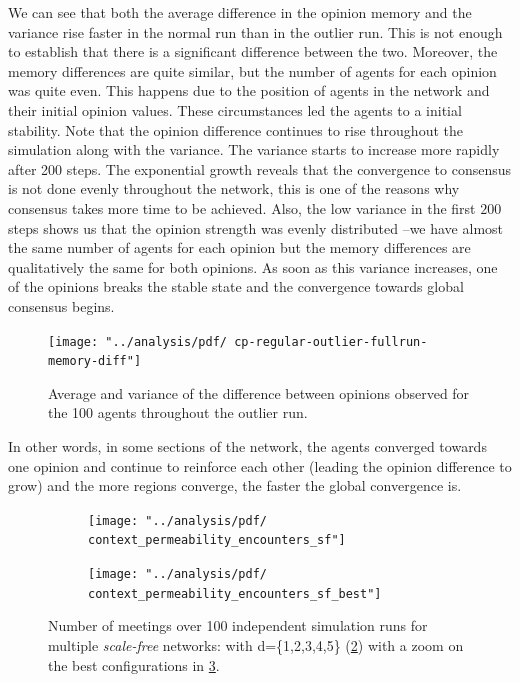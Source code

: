 \documentclass[preprint,number]{elsarticle}
\begin{document}
We can see that both the average difference in the opinion memory and the variance rise faster in the normal run than in the outlier run. This is not enough to establish that there is a significant difference between the two. Moreover, the memory differences are quite similar, but the number of agents for each opinion was quite even. This happens due to the position of agents in the network and their initial opinion values. These circumstances led the agents to a initial stability. Note that the opinion difference continues to rise throughout the simulation along with the variance. The variance starts to increase more rapidly after 200 steps. The exponential growth reveals that the convergence to consensus is not done evenly throughout the network, this is one of the reasons why consensus takes more time to be achieved. Also, the low variance in the first $200$ steps shows us that the opinion strength was evenly distributed --we have almost the same number of agents for each opinion but the memory differences are qualitatively the same for both opinions. As soon as this variance increases, one of the opinions breaks the stable state and the convergence towards global consensus begins. 

\begin{figure}[H]
	\centering
	\texttt{[image: "../analysis/pdf/ cp-regular-outlier-fullrun-memory-diff"]}
	\begin{minipage}{0.9\textwidth}
		\caption{Average and variance of the difference between opinions observed for the 100 agents throughout the outlier run.}
		\label{fig:ctx_perm_kreg_run_outlier_diff_full}
	\end{minipage}
\end{figure}

\noindent In other words, in some sections of the network, the agents converged towards one opinion and continue to reinforce each other (leading the opinion difference to grow) and the more regions converge, the faster the global convergence is.  

\begin{figure}[H]
	\centering
	\begin{subfigure}{.49\linewidth}
		\centering
		\texttt{[image: "../analysis/pdf/ context\_permeability\_encounters\_sf"]}
		\caption{}
		\label{fig:ctx_perm_sf_full}
	\end{subfigure}%
	\begin{subfigure}{.49\linewidth}
		\centering
		\texttt{[image: "../analysis/pdf/   context\_permeability\_encounters\_sf\_best"]}
		\caption{}
		\label{fig:ctx_perm_sf_best}
	\end{subfigure}
	\begin{minipage}{0.9\linewidth}
		\vspace{0.2cm}
		\caption{Number of meetings over 100 independent simulation runs for multiple \textit{scale-free} networks: with d=\{1,2,3,4,5\} (\ref{fig:ctx_perm_sf_full}) with a zoom on the best configurations in \ref{fig:ctx_perm_sf_best}.}
		\label{fig:ctx_perm_sf}
	\end{minipage}
\end{figure}
\end{document}
